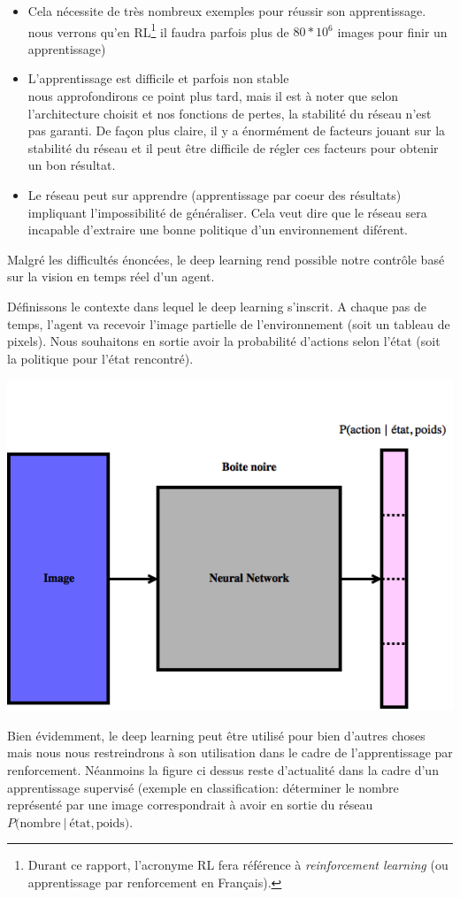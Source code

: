 \begin{itemize}
    \item Cela nécessite de très nombreux exemples pour réussir son apprentissage.\\nous verrons qu'en \gls{RL}\footnote{Durant ce rapport, l'acronyme \gls{RL} fera référence à \emph{reinforcement learning} (ou apprentissage par renforcement en Français).} il faudra parfois plus de $80*10^6$ images pour finir un apprentissage)
    \item L'apprentissage est difficile et parfois non stable\\nous approfondirons ce point plus tard, mais il est à noter que selon l'architecture choisit et nos fonctions de pertes, la stabilité du réseau n'est pas garanti. De façon plus claire, il y a énormément de facteurs jouant sur la stabilité du réseau et il peut être difficile de régler ces facteurs pour obtenir un bon résultat. 
    \item Le réseau peut sur apprendre (apprentissage par coeur des résultats) impliquant l'impossibilité de généraliser. Cela veut dire que le réseau sera incapable d'extraire une bonne politique d'un environnement diférent.
\end{itemize}

Malgré les difficultés énoncées, le deep learning rend possible notre contrôle basé sur la vision en temps réel d'un agent. 


Définissons le contexte dans lequel le deep learning s'inscrit. A chaque pas de temps, l'agent va recevoir l'image partielle de l'environnement (soit un tableau de pixels). Nous souhaitons en sortie avoir la probabilité d'actions selon l'état (soit la politique pour l'état rencontré).

\begin{center}

\includegraphics[width=.4\linewidth]{./assets/DeepLearning/dl}
\end{center}

Bien évidemment, le deep learning peut être utilisé pour bien d'autres choses mais nous nous restreindrons à son utilisation dans le cadre de l'apprentissage par renforcement. Néanmoins la figure ci dessus reste d'actualité dans la cadre d'un apprentissage supervisé (exemple en classification: déterminer le nombre représenté par une image correspondrait à avoir en sortie du réseau $P(\text{nombre} \:\vert\: \text{état}, \text{poids)}$. 

